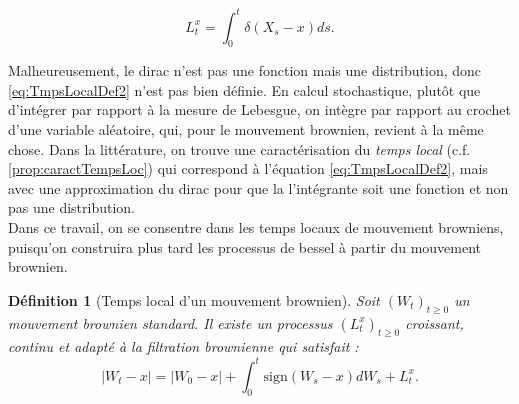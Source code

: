 \documentclass[openany]{book}
\newcommand{\1}{\mathbbm{1}}
\newcommand{\sign}{\text{sign}}
\theoremstyle{thmfont}
\theoremstyle{deffont}
\newtheorem{definition}[definition]{Définition}
\theoremstyle{thmfont}
\theoremstyle{deffont}
\begin{document}
\begin{equation}
  \label{eq:TmpsLocalDef2}
  L^x_t= \int_0^t\delta(X_s-x)ds.
\end{equation}

Malheureusement, le dirac n'est pas une fonction mais une distribution, donc \eqref{eq:TmpsLocalDef2} n'est pas bien définie. En calcul stochastique, plutôt que d'intégrer par rapport à la mesure de Lebesgue, on intègre par rapport au crochet d'une variable aléatoire, qui, pour le mouvement brownien, revient à la même chose. Dans la littérature, on trouve une caractérisation du \textit{temps local} (c.f. \autoref{prop:caractTempsLoc}) qui correspond à l'équation \eqref{eq:TmpsLocalDef2}, mais avec une approximation du dirac pour que la l'intégrante soit une fonction et non pas une distribution. \\

Dans ce travail, on se consentre dans les temps locaux de mouvement browniens, puisqu'on construira plus tard les processus de bessel à partir du mouvement brownien.

\begin{definition}[Temps local d'un mouvement brownien]
  \label{def:TempsLoc}
  Soit $(W_t)_{t\geq0}$ un mouvement brownien standard. Il existe un processus $(L_t^x)_{t\geq0}$ croissant, continu et adapté à la filtration brownienne qui satisfait :
  \begin{equation}
    |W_t -x|  = |W_0-x| + \int_0^t\sign(W_s - x)dW_s + L_t^x.
    \label{eq:tempsLocDef}
  \end{equation}
\end{definition}
\end{document}
